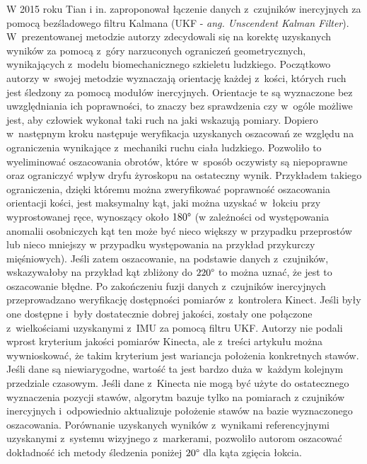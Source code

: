 W 2015 roku Tian i in. \cite{Tian2015a} zaproponował łączenie danych z~czujników inercyjnych za pomocą bezśladowego filtru Kalmana (UKF - \emph{ang. Unscendent Kalman Filter}). W~prezentowanej metodzie autorzy zdecydowali się na korektę uzyskanych wyników za pomocą z~góry narzuconych ograniczeń geometrycznych, wynikających z~modelu biomechanicznego szkieletu ludzkiego. Początkowo autorzy w~swojej metodzie wyznaczają orientację każdej z~kości, których ruch jest śledzony za pomocą modułów inercyjnych. Orientacje te są wyznaczone bez uwzględniania ich poprawności, to znaczy bez sprawdzenia czy w~ogóle możliwe jest, aby człowiek wykonał taki ruch na jaki wskazują pomiary. Dopiero w~następnym kroku następuje weryfikacja uzyskanych oszacowań ze względu na ograniczenia wynikające z~mechaniki ruchu ciała ludzkiego. Pozwoliło to wyeliminować oszacowania obrotów, które w~sposób oczywisty są niepoprawne oraz ograniczyć wpływ dryfu żyroskopu na ostateczny wynik. Przykładem takiego ograniczenia, dzięki któremu można zweryfikować poprawność oszacowania orientacji kości, jest maksymalny kąt, jaki można uzyskać w~łokciu przy wyprostowanej ręce, wynoszący około $180\degree$ (w zależności od występowania anomalii osobniczych kąt ten może być nieco większy w przypadku przeprostów lub nieco mniejszy w przypadku występowania na przykład przykurczy mięśniowych). Jeśli zatem oszacowanie, na podstawie danych z~czujników, wskazywałoby na przykład kąt zbliżony do $220\degree$ to można uznać, że jest to oszacowanie błędne. Po zakończeniu fuzji danych z~czujników inercyjnych przeprowadzano weryfikację dostępności pomiarów z~kontrolera Kinect. Jeśli były one dostępne i~były dostatecznie dobrej jakości, zostały one połączone z~wielkościami uzyskanymi z~IMU za pomocą filtru UKF. Autorzy nie podali wprost kryterium jakości pomiarów Kinecta, ale z~treści artykułu można wywnioskować, że takim kryterium jest wariancja położenia konkretnych stawów. Jeśli dane są niewiarygodne, wartość ta jest bardzo duża w~każdym kolejnym przedziale czasowym. Jeśli dane z~Kinecta nie mogą być użyte do ostatecznego wyznaczenia pozycji stawów, algorytm bazuje tylko na pomiarach z czujników inercyjnych i~odpowiednio aktualizuje położenie stawów na bazie wyznaczonego oszacowania. Porównanie uzyskanych wyników z~wynikami referencyjnymi uzyskanymi z~systemu wizyjnego z~markerami, pozwoliło autorom oszacować dokładność ich metody śledzenia poniżej $20\degree$ dla kąta zgięcia łokcia.																																																	

